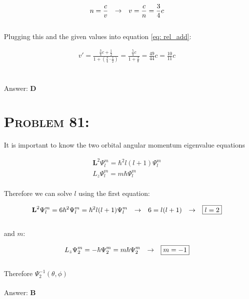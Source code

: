\documentclass{article}
\begin{document}
\begin{gather}
n = \frac{c}{v} \hspace{.1in} \rightarrow \hspace{.1in} v =\frac{c}{n} = \frac{3}{4} c
\end{gather}
\\
Plugging this and the given values into equation \ref{eq: rel_add}:

\begin{gather}
v' = \frac{\frac{3}{4}c + \frac{1}{2}}{1 + \left( \frac{3}{4} \cdot \frac{1}{2}   \right)} = \frac{\frac{5}{4}c}{1 + \frac{3}{8}} = \frac{49}{44} c = \boxed{\frac{10}{11} c}\nonumber
\end{gather}
\\\\
Answer: \textbf{\textcolor{ProcessBlue}D}\\


\section{\textsc{Problem 81:}} It is important to know the two orbital angular momentum eigenvalue equations

\begin{gather}
\textbf{L}^{2} \Psi^{m}_{l} = \hbar^{2} l (l+1) \Psi^{m}_{l}\\
L_{z} \Psi^{m}_{l} = m \hbar \Psi^{m}_{l}
\end{gather}
\\
Therefore we can solve $l$ using the first equation:

\begin{gather}
\textbf{L}^{2} \Psi^{m}_{l} = 6 \hbar^{2} \Psi^{m}_{l} = \hbar^{2} l (l+1) \Psi^{m}_{l} \hspace{.1in} \rightarrow \hspace{.1in} 6 = l (l+1) \hspace{.1in} \rightarrow \hspace{.1in} \boxed{l = 2} \nonumber
\end{gather}
\\
and $m$:

\begin{gather}
L_{z} \Psi^{m}_{2} =- \hbar \Psi^{m}_{2} = m \hbar \Psi^{m}_{2} \hspace{.1in} \rightarrow \hspace{.1in} \boxed{m = -1}\nonumber
\end{gather}
\\
Therefore $\boxed{\Psi^{-1}_{2} \left(  \theta, \phi  \right)}$
\\\\
Answer: \textbf{\textcolor{ProcessBlue}B}\\
\end{document}
